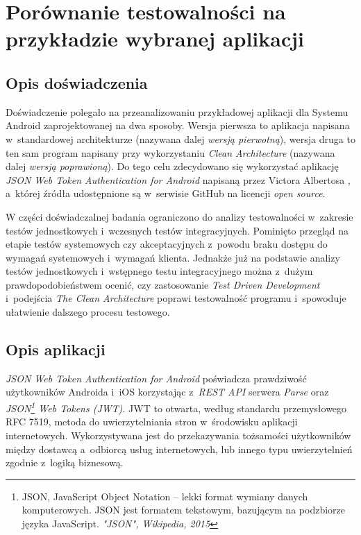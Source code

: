 \chapter{Porównanie testowalności \newline na przykładzie wybranej aplikacji}
\label{analiza_testow}

\section{Opis doświadczenia}
Doświadczenie polegało na przeanalizowaniu przykładowej aplikacji dla Systemu Android zaprojektowanej na dwa sposoby. Wersja pierwsza to aplikacja napisana w~standardowej architekturze (nazywana dalej \textit{wersją pierwotną}), wersja druga to ten sam program napisany przy wykorzystaniu \textit{Clean Architecture} (nazywana dalej \textit{wersją poprawioną}). Do tego celu zdecydowano się wykorzystać
aplikację \textit{JSON Web Token Authentication for Android} napisaną przez Victora Albertosa \cite{website:victor:aplication} , a~której źródła udostępnione są w~serwisie GitHub na licencji \textit{open source}.

W części doświadczalnej badania ograniczono do analizy testowalności w~zakresie testów jednostkowych i~wczesnych testów integracyjnych. Pominięto przegląd na etapie testów systemowych czy akceptacyjnych z~powodu braku dostępu do wymagań systemowych i~wymagań klienta. Jednakże już na podstawie analizy testów jednostkowych i~wstępnego testu integracyjnego można z~dużym prawdopodobieństwem ocenić, czy zastosowanie \textit{Test Driven Development} i~podejścia \textit{The Clean Architecture} poprawi testowalność programu i~spowoduje ułatwienie dalszego procesu testowego.

\section{Opis aplikacji}
\textit{JSON Web Token Authentication for Android} poświadcza prawdziwość użytkowników Androida i~iOS korzystając z~\textit{REST API} serwera \textit{Parse} oraz \textit{JSON\footnote{JSON, JavaScript Object Notation – lekki format wymiany danych komputerowych. JSON jest formatem tekstowym, bazującym na podzbiorze języka JavaScript. \textit{"JSON", Wikipedia, 2015}} Web Tokens (JWT)}. JWT to otwarta, według standardu przemysłowego RFC 7519\cite{website:jwt:rfc7519}, metoda do uwierzytelniania stron w~środowisku aplikacji internetowych. Wykorzystywana jest do przekazywania tożsamości użytkowników między dostawcą a~odbiorcą usług internetowych, lub innego typu uwierzytelnień zgodnie z~logiką biznesową. 

